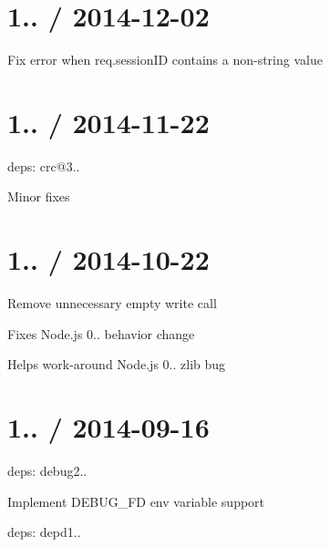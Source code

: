 \section*{1.. / 2014-\/12-\/02 }


\begin{DoxyItemize}
\item Fix error when {\ttfamily req.\+session\+ID} contains a non-\/string value
\end{DoxyItemize}

\section*{1.. / 2014-\/11-\/22 }


\begin{DoxyItemize}
\item deps\+: crc@3..
\begin{DoxyItemize}
\item Minor fixes
\end{DoxyItemize}
\end{DoxyItemize}

\section*{1.. / 2014-\/10-\/22 }


\begin{DoxyItemize}
\item Remove unnecessary empty write call
\begin{DoxyItemize}
\item Fixes Node.\+js 0.. behavior change
\item Helps work-\/around Node.\+js 0.. zlib bug
\end{DoxyItemize}
\end{DoxyItemize}

\section*{1.. / 2014-\/09-\/16 }


\begin{DoxyItemize}
\item deps\+: debug2..
\begin{DoxyItemize}
\item Implement {\ttfamily D\+E\+B\+U\+G\+\_\+\+FD} env variable support
\end{DoxyItemize}
\item deps\+: depd1..
\end{DoxyItemize}

